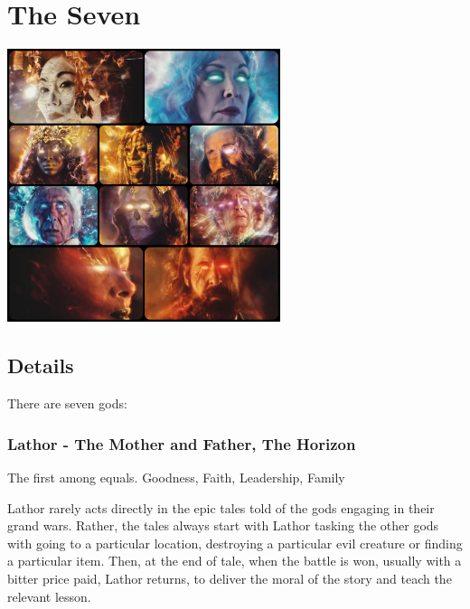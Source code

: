 \section{The Seven}

\vspace{4mm}

\begin{center}
\includegraphics[width=80mm]{./content/img/theGods.jpg}
\begin{figure}[h]
\end{figure}
\end{center}

\subsection*{Details} 

\vspace{2mm}

There are seven gods:

\subsubsection{Lathor - The Mother and Father, The Horizon}

\vspace{2mm}

The first among equals. Goodness, Faith, Leadership, Family

Lathor rarely acts directly in the epic tales told of the gods engaging in their grand wars. Rather, the tales always start with Lathor tasking the other gods with going to a particular location, destroying a particular evil creature or finding a particular item. Then, at the end of tale, when the battle is won, usually with a bitter price paid, Lathor returns, to deliver the moral of the story and teach the relevant lesson.

